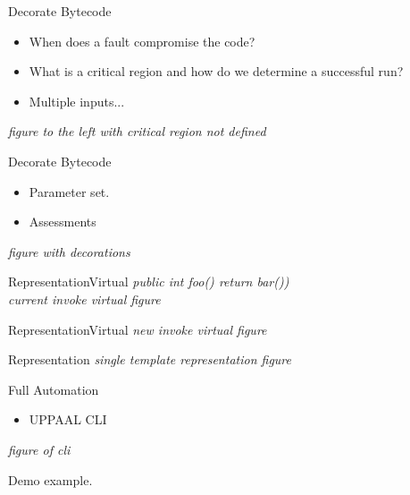 

\begin{frame}{Decorate Bytecode}{}
\begin{itemize}
\item When does a fault compromise the code?
\item What is a critical region and how do we determine a successful run?
\item Multiple inputs... 
\end{itemize}
\textit{figure to the left with critical region not defined}
\end{frame}

\begin{frame}{Decorate Bytecode}{}
\begin{itemize}
\item Parameter set.
\item Assessments
\end{itemize}
\textit{figure with decorations}
\end{frame}

\begin{frame}{Representation}{Virtual}
\textit{public int foo() {return bar())}}\\
\textit{current invoke virtual figure}

\end{frame}

\begin{frame}{Representation}{Virtual}
\textit{new invoke virtual figure}
\end{frame}

\begin{frame}{Representation}{}
\textit{single template representation figure}
\end{frame}


\begin{frame}{Full Automation}{}
\begin{itemize}
\item UPPAAL CLI
\end{itemize}
\textit{figure of cli}
\end{frame}

\begin{frame}{Demo}{}
example.
\end{frame}

